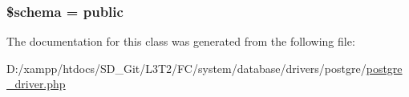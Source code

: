 \subsubsection[{\$schema}]{\setlength{\rightskip}{0pt plus 5cm}\$schema = \textquotesingle{}public\textquotesingle{}}\label{class_c_i___d_b__postgre__driver_a83022b1d70799d2bde3d64dca9cb40ee}


The documentation for this class was generated from the following file\+:\begin{DoxyCompactItemize}
\item 
D\+:/xampp/htdocs/\+S\+D\+\_\+\+Git/\+L3\+T2/\+F\+C/system/database/drivers/postgre/\hyperlink{postgre__driver_8php}{postgre\+\_\+driver.\+php}\end{DoxyCompactItemize}
